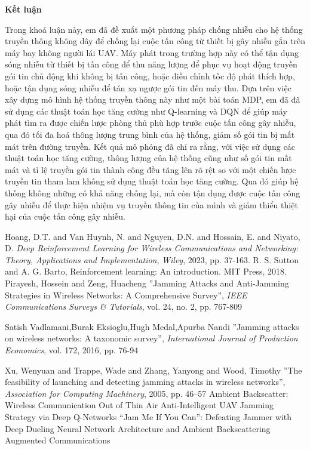 \documentclass{uetgraduation}
\begin{document}
\clearpage\noindent\Large\textbf{Kết luận}\par\normalsize\vspace{1cm}
Trong khoá luận này, em đã đề xuất một phương pháp chống nhiễu cho hệ thống truyền thông không dây để chống lại cuộc tấn công từ thiết bị gây nhiễu gắn trên máy bay không người lái UAV.
Máy phát trong trường hợp này có thể tận dụng sóng nhiễu từ thiết bị tấn công để thu năng lượng để phục vụ hoạt động truyền gói tin chủ động khi không bị tấn công, hoặc điều chỉnh tốc
độ phát thích hợp, hoặc tận dụng sóng nhiễu để tán xạ ngược gói tin đến máy thu. Dựa trên việc xây dựng mô hình hệ thống truyền thông này như một bài toán MDP, em đã đã sử dụng các
thuật toán học tăng cường như
Q-learning và DQN để giúp máy phát tìm ra được chiến lược phòng thủ phù hợp trước cuộc tấn công gây nhiễu, qua đó tối đa hoá thông lượng trung bình của hệ thống, giảm số gói tin bị mất mát trên đường truyền.
Kết quả mô phỏng đã chỉ ra rằng, với việc sử dụng các thuật toán học tăng cường, thông lượng của hệ thống cũng như số gói tin mất mát và tỉ lệ truyền gói tin thành công đều tăng lên rõ
rệt so với một chiến lược truyền tin tham lam không sử dụng thuật toán học tăng cường. Qua đó giúp hệ thống không những có khả năng chống lại, mà còn tận dụng được cuộc tấn công gây nhiễu
để thực hiện nhiệm vụ truyền thông tin của mình và giảm thiểu thiệt hại của cuộc tấn công gây nhiễu.

\begin{thebibliography}{9}
\begin{bibsection}{}
    Hoang, D.T. and Van Huynh, N. and Nguyen, D.N. and Hossain, E. and Niyato, D.
    \textit{Deep Reinforcement Learning for Wireless Communications and Networking: Theory, Applications and Implementation},
    \textit{Wiley}, 2023, pp. 37-163.
    R. S. Sutton and A. G. Barto, Reinforcement learning: An introduction.
    MIT Press, 2018.
    Pirayesh, Hossein and Zeng, Huacheng
    ''Jamming Attacks and Anti-Jamming Strategies in Wireless Networks: A Comprehensive Survey'',
    \textit{IEEE Communications Surveys \& Tutorials},
    vol. 24, no. 2,
    pp. 767-809

    Satish Vadlamani,Burak Eksioglu,Hugh Medal,Apurba Nandi
    ''Jamming attacks on wireless networks: A taxonomic survey'',
    \textit{International Journal of Production Economics},
    vol. 172,
    2016,
    pp. 76-94

    Xu, Wenyuan and Trappe, Wade and Zhang, Yanyong and Wood, Timothy
    ''The feasibility of launching and detecting jamming attacks in wireless networks'',
    \textit{Association for Computing Machinery},
    2005,
    pp. 46–57
    Ambient Backscatter: Wireless Communication Out of Thin Air
    Anti-Intelligent UAV Jamming Strategy via Deep Q-Networks
    “Jam Me If You Can”: Defeating Jammer with Deep Dueling Neural Network Architecture and Ambient Backscattering Augmented Communications
\end{bibsection}
\end{thebibliography}
\end{document}
